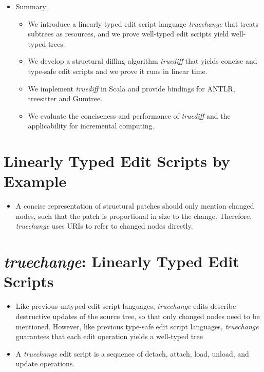 \begin{itemize}
\begin{itemize}
    \end{itemize}
    \item Summary:
    \begin{itemize}
        \item We introduce a linearly typed edit script language \textit{truechange} that treats subtrees as resources, and we prove well-typed edit scripts yield well-typed trees.
        \item We develop a structural diffing algorithm \textit{truediff} that yields concise and type-safe edit scripts and we prove it runs in linear time. 
        \item We implement \textit{truediff} in Scala and provide bindings for ANTLR, treesitter and Gumtree.
        \item We evaluate the conciseness and performance of \textit{truediff} and the applicability for incremental computing.
    \end{itemize}
\end{itemize}

\section{Linearly Typed Edit Scripts by Example}
\begin{itemize}
    \item A concise representation of structural patches should only mention changed nodes, such that the patch is proportional in size to the change. Therefore, \textit{truechange} uses URIs to refer to changed nodes directly.
\end{itemize}

\section{\textit{truechange}: Linearly Typed Edit Scripts}
\begin{itemize}
    \item Like previous untyped edit script languages, \textit{truechange} edits describe destructive updates of the source tree, so that only changed nodes need to be mentioned. However, like previous type-safe edit script languages, \textit{truechange} guarantees that each edit operation yields a well-typed tree
    \item A \textit{truechange} edit script is a sequence of detach, attach, load, unload, and update operations.
\end{itemize}
\newpage
